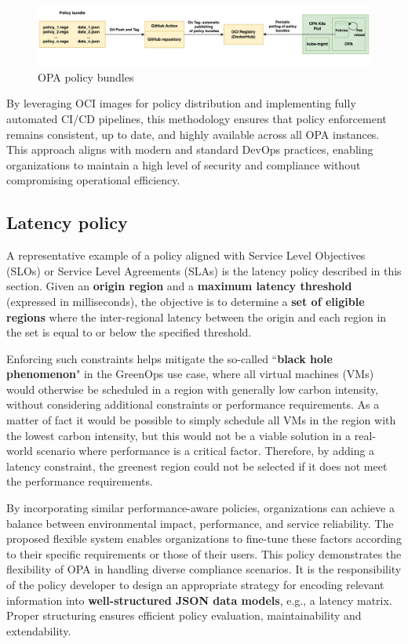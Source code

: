 \begin{figure}[t]
\centering
\includegraphics[width=1\linewidth]{images/opa_bundles.png}
\caption{OPA policy bundles}
\label{fig:opa_bundles}
\end{figure}

By leveraging OCI images for policy distribution and implementing fully automated CI/CD pipelines, this methodology ensures that policy enforcement remains consistent, up to date, and highly available across all OPA instances. 
This approach aligns with modern and standard DevOps practices, enabling organizations to maintain a high level of security and compliance without compromising operational efficiency.

\subsection{Latency policy}

A representative example of a policy aligned with Service Level Objectives (SLOs) or Service Level Agreements (SLAs) is the latency policy described in this section.
Given an \textbf{origin region} and a \textbf{maximum latency threshold} (expressed in milliseconds), the objective is to determine a \textbf{set of eligible regions} where the inter-regional latency between the origin and each region in the set is equal to or below the specified threshold.

Enforcing such constraints helps mitigate the so-called ``\textbf{black hole phenomenon}" in the GreenOps use case, where all virtual machines (VMs) would otherwise be scheduled in a region with generally low carbon intensity, without considering additional constraints or performance requirements.
As a matter of fact it would be possible to simply schedule all VMs in the region with the lowest carbon intensity, but this would not be a viable solution in a real-world scenario where performance is a critical factor.
Therefore, by adding a latency constraint, the greenest region could not be selected if it does not meet the performance requirements.

By incorporating similar performance-aware policies, organizations can achieve a balance between environmental impact, performance, and service reliability.
The proposed flexible system enables organizations to fine-tune these factors according to their specific requirements or those of their users. 
This policy demonstrates the flexibility of OPA in handling diverse compliance scenarios. It is the responsibility of the policy developer to design an appropriate strategy for encoding relevant information into \textbf{well-structured JSON data models}, e.g., a latency matrix. Proper structuring ensures efficient policy evaluation, maintainability and extendability.

